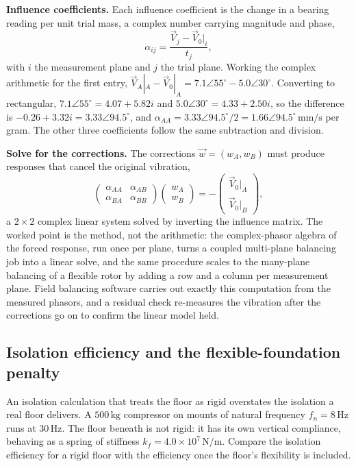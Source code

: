 \textbf{Influence coefficients.} Each influence coefficient is the
change in a bearing reading per unit trial mass, a complex number
carrying magnitude and phase,
\[
\alpha_{ij} = \frac{\vec V_{j} - \vec V_0\big|_i}{t_j},
\]
with $i$ the measurement plane and $j$ the trial plane. Working the
complex arithmetic for the first entry, $\vec V_A|_A - \vec V_0|_A =
7.1\angle 55^\circ - 5.0\angle 30^\circ$. Converting to rectangular,
$7.1\angle 55^\circ = 4.07 + 5.82i$ and $5.0\angle 30^\circ = 4.33 +
2.50i$, so the difference is $-0.26 + 3.32i = 3.33\angle 94.5^\circ$,
and $\alpha_{AA} = 3.33\angle 94.5^\circ/2 = 1.66\angle 94.5^\circ\,\si{
\milli\meter\per\second}$ per gram. The other three coefficients follow
the same subtraction and division.

\textbf{Solve for the corrections.} The corrections $\vec w = (w_A,
w_B)$ must produce responses that cancel the original vibration,
\[
\begin{pmatrix}\alpha_{AA} & \alpha_{AB} \\ \alpha_{BA} & \alpha_{BB}
\end{pmatrix}\begin{pmatrix}w_A \\ w_B\end{pmatrix} = -\begin{pmatrix}
\vec V_0|_A \\ \vec V_0|_B\end{pmatrix},
\]
a $2\times 2$ complex linear system solved by inverting the influence
matrix. The worked point is the method, not the arithmetic: the
complex-phasor algebra of the forced response, run once per plane,
turns a coupled multi-plane balancing job into a linear solve, and the
same procedure scales to the many-plane balancing of a flexible rotor by
adding a row and a column per measurement plane. Field balancing
software carries out exactly this computation from the measured phasors,
and a residual check re-measures the vibration after the corrections go
on to confirm the linear model held.

\subsection{Isolation efficiency and the flexible-foundation penalty}

An isolation calculation that treats the floor as rigid overstates the
isolation a real floor delivers. A $500\,\si{\kilogram}$ compressor on
mounts of natural frequency $f_n = 8\,\si{\hertz}$ runs at $30\,\si{
\hertz}$. The floor beneath is not rigid: it has its own vertical
compliance, behaving as a spring of stiffness $k_f = 4.0\times
10^7\,\si{\newton\per\meter}$. Compare the isolation efficiency for a
rigid floor with the efficiency once the floor's flexibility is
included.

